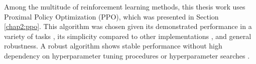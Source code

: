 


Among the multitude of reinforcement learning methods, this thesis work uses Proximal Policy Optimization (PPO), which was presented in Section \ref{chap2:ppo}. This algorithm was chosen given its demonstrated performance in a variety of tasks \cite{berner2019dota, akkaya2019solving, schulman2017proximal, yu2021surprising}, its simplicity compared to other implementations \cite{schulman2017proximal}, and general robustness. A robust algorithm shows stable performance without high dependency on hyperparameter tuning procedures or hyperparameter searches \cite{schulman2017proximal}.

